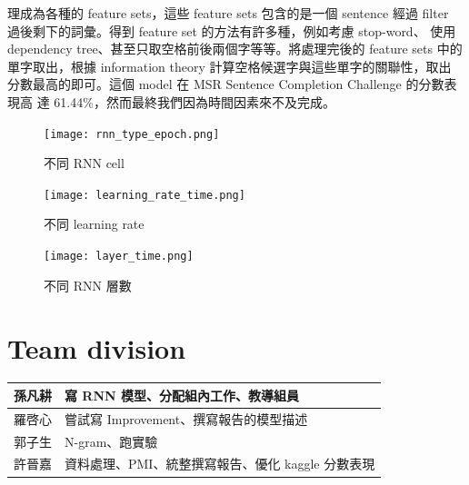 \documentclass[12pt, a4paper]{article}
\theoremstyle{mystyle}	%
\begin{document}
\begin{enumerate}
    理成為各種的 feature sets，這些 feature sets 包含的是一個 sentence 經過 
    filter 過後剩下的詞彙。得到 feature set 的方法有許多種，例如考慮 stop-word、
    使用 dependency tree、甚至只取空格前後兩個字等等。將處理完後的 feature sets 
    中的單字取出，根據 information theory 計算空格候選字與這些單字的關聯性，取出
    分數最高的即可。這個 model 在 MSR Sentence Completion Challenge 的分數表現高
    達 61.44\%，然而最終我們因為時間因素來不及完成。
    \begin{figure}[!htb]
      \centering
      \texttt{[image: rnn\_type\_epoch.png]}
      \caption{不同 RNN cell}
      \label{fig:rnnType}
     \endminipage\hfill
      \texttt{[image: learning\_rate\_time.png]}
      \caption{不同 learning rate}
      \label{fig:learningRate}
     \endminipage\hfill
      \texttt{[image: layer\_time.png]}
      \caption{不同 RNN 層數}
      \label{fig:layerTime}
     \endminipage
    \end{figure}
\end{enumerate}

\section{Team division}
\begin{table}[h]
\centering
\begin{tabular}{ |C{2cm}|C{10cm}| }
  \hline
  孫凡耕 & 寫 RNN 模型、分配組內工作、教導組員\\
  \hline
  羅啓心 & 嘗試寫 Improvement、撰寫報告的模型描述\\
  \hline
  郭子生 & N-gram、跑實驗\\
  \hline
  許晉嘉 & 資料處理、PMI、統整撰寫報告、優化 kaggle 分數表現\\
  \hline
\end{tabular}
\end{table}
\end{document}
